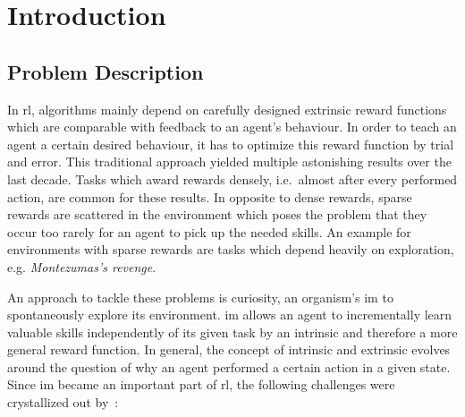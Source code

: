 \documentclass[draft,final]{vutinfth} %
\newcommand{\p}[1]{see p. #1}
\begin{document}
    \begin{kurzfassung}
    \end{kurzfassung}

    \begin{abstract}
    \end{abstract}


    \tableofcontents %

    \mainmatter


    \chapter{Introduction}


    \section{Problem Description}\label{sec:problem-description}
    In \gls{rl}, algorithms mainly depend on carefully designed extrinsic reward functions which are comparable with feedback to an agent's behaviour.
    In order to teach an agent a certain desired behaviour, it has to optimize this reward function by trial and error.
    This traditional approach yielded multiple astonishing results over the last decade.
    Tasks which award rewards densely, i.e.\ almost after every performed action, are common for these results.
    In opposite to dense rewards, sparse rewards are scattered in the environment which poses the problem that they occur too rarely for an agent to pick up the needed skills.
    An example for environments with sparse rewards are tasks which depend heavily on exploration, e.g. \textit{Montezumas's revenge}.

    An approach to tackle these problems is curiosity, an organism's \gls{im} to spontaneously explore its environment.
    \gls{im} allows an agent to incrementally learn valuable skills independently of its given task by an intrinsic and therefore a more general reward function.
    In general, the concept of intrinsic and extrinsic evolves around the question of why an agent performed a certain action in a given state.
    Since \gls{im} became an important part of \gls{rl}, the following challenges were crystallized out by~\cite[\p{6}]{aubret_survey_2019}:
\end{document}
